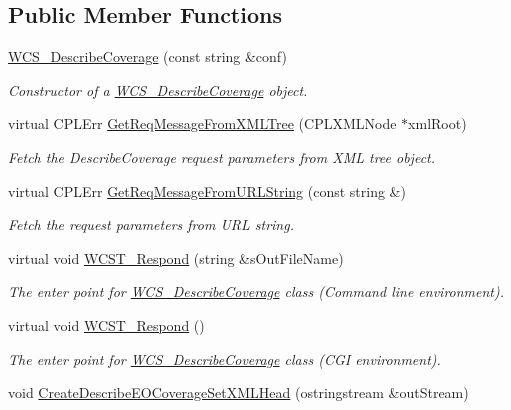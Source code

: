 \subsection*{Public Member Functions}
\begin{DoxyCompactItemize}
\item 
\hyperlink{classWCS__DescribeCoverage_a02b9cfa4a0ba1d6bf1f6f59da9be2742}{WCS\_\-DescribeCoverage} (const string \&conf)
\begin{DoxyCompactList}\small\item\em Constructor of a \hyperlink{classWCS__DescribeCoverage}{WCS\_\-DescribeCoverage} object. \end{DoxyCompactList}\item 
virtual CPLErr \hyperlink{classWCS__DescribeCoverage_aaa1f795a02b2b266e99302cef09fbd27}{GetReqMessageFromXMLTree} (CPLXMLNode $\ast$xmlRoot)
\begin{DoxyCompactList}\small\item\em Fetch the DescribeCoverage request parameters from XML tree object. \end{DoxyCompactList}\item 
virtual CPLErr \hyperlink{classWCS__DescribeCoverage_a68d2ceb47305263c78f9676e11ac7387}{GetReqMessageFromURLString} (const string \&)
\begin{DoxyCompactList}\small\item\em Fetch the request parameters from URL string. \end{DoxyCompactList}\item 
virtual void \hyperlink{classWCS__DescribeCoverage_a0c3bbc4bf7cd2ec6d469330d636c3390}{WCST\_\-Respond} (string \&sOutFileName)
\begin{DoxyCompactList}\small\item\em The enter point for \hyperlink{classWCS__DescribeCoverage}{WCS\_\-DescribeCoverage} class (Command line environment). \end{DoxyCompactList}\item 
virtual void \hyperlink{classWCS__DescribeCoverage_a6536fa20a925c8ce4b1d96f7e134e4ac}{WCST\_\-Respond} ()
\begin{DoxyCompactList}\small\item\em The enter point for \hyperlink{classWCS__DescribeCoverage}{WCS\_\-DescribeCoverage} class (CGI environment). \end{DoxyCompactList}\item 
void \hyperlink{classWCS__DescribeCoverage_ab007cc5bbbfa0d7e1707af408df27710}{CreateDescribeEOCoverageSetXMLHead} (ostringstream \&outStream)

\end{DoxyCompactItemize}
